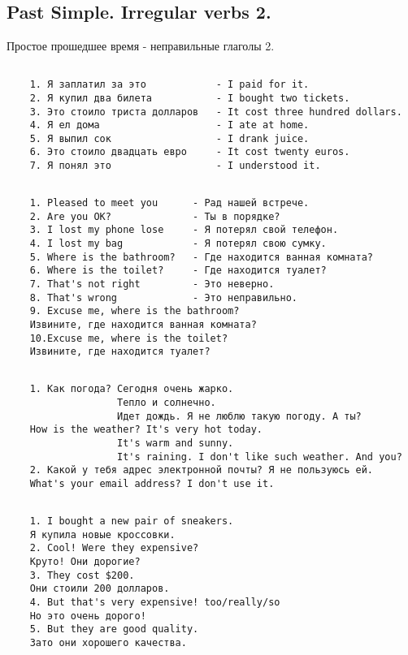 \subsection{Past Simple. Irregular verbs 2.}
Простое прошедшее время - неправильные глаголы 2.
\subsection*{}
\begin{verbatim}
    1. Я заплатил за это            - I paid for it.
    2. Я купил два билета           - I bought two tickets.
    3. Это стоило триста долларов   - It cost three hundred dollars.
    4. Я ел дома                    - I ate at home.
    5. Я выпил сок                  - I drank juice.
    6. Это стоило двадцать евро     - It cost twenty euros.
    7. Я понял это                  - I understood it.
\end{verbatim}

\subsection*{}
\begin{verbatim}
    1. Pleased to meet you      - Рад нашей встрече.
    2. Are you OK?              - Ты в порядке?
    3. I lost my phone lose     - Я потерял свой телефон.
    4. I lost my bag            - Я потерял свою сумку.
    5. Where is the bathroom?   - Где находится ванная комната?
    6. Where is the toilet?     - Где находится туалет?
    7. That's not right         - Это неверно.
    8. That's wrong             - Это неправильно.
    9. Excuse me, where is the bathroom?
    Извините, где находится ванная комната?
    10.Excuse me, where is the toilet?
    Извините, где находится туалет?
\end{verbatim}

\subsection*{}
\begin{verbatim}
    1. Как погода? Сегодня очень жарко.
                   Тепло и солнечно.
                   Идет дождь. Я не люблю такую погоду. А ты?
    How is the weather? It's very hot today.
                   It's warm and sunny.
                   It's raining. I don't like such weather. And you?
    2. Какой у тебя адрес электронной почты? Я не пользуюсь ей.
    What's your email address? I don't use it.
\end{verbatim}

\subsection*{}
\begin{verbatim}
    1. I bought a new pair of sneakers.
    Я купила новые кроссовки.
    2. Cool! Were they expensive?
    Круто! Они дорогие?
    3. They cost $200.
    Они стоили 200 долларов.
    4. But that's very expensive! too/really/so
    Но это очень дорого!
    5. But they are good quality.
    Зато они хорошего качества.
\end{verbatim}